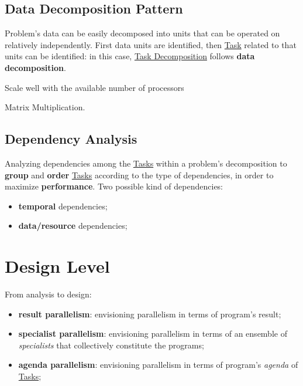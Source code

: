 \subsection{Data Decomposition Pattern}\label{sub:ed_data_decomposition_pattern} %
Problem's data can be easily decomposed into units that can be operated on relatively independently.
First data units are identified, then \hyperref[def:task]{Task} related to that units can be identified: in this case, \hyperref[sub:ed_task_decomposition_pattern]{Task Decomposition} follows \textbf{data decomposition}.
\begin{note}
    Scale well with the available number of processors
\end{note}
\begin{example}{}{}
    Matrix Multiplication.
\end{example}
%
\subsection{Dependency Analysis}\label{sub:ed_dependency_analysis} %
Analyzing dependencies among the \hyperref[def:task]{Tasks} within a problem's decomposition to \textbf{group} and \textbf{order} \hyperref[def:task]{Tasks} according to the type of dependencies, in order to maximize \textbf{performance}.
Two possible kind of dependencies:
\begin{itemize}
    \item \textbf{temporal} dependencies;
    \item \textbf{data/resource} dependencies;
\end{itemize}
%
\section{Design Level}\label{sec:ed_design_level} %
From analysis to design:
\begin{itemize}
    \item \textbf{result parallelism}: envisioning parallelism in terms of program's result;
    \item \textbf{specialist parallelism}: envisioning parallelism in terms of an ensemble of \textit{specialists} that collectively constitute the programs;
    \item \textbf{agenda parallelism}: envisioning parallelism in terms of program's \textit{agenda} of \hyperref[def:task]{Tasks};
\end{itemize}
%
